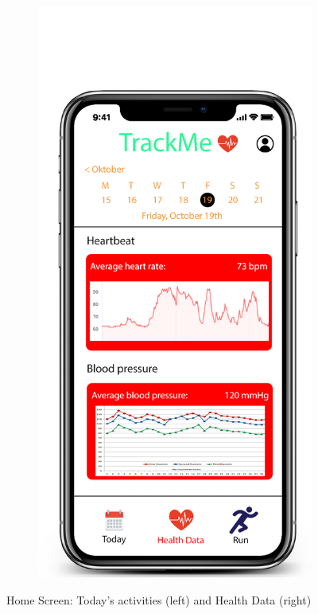 \documentclass[12pt]{article}
\begin{document}
\begin{figure}[t!]
\begin{subfigure}{.4\textwidth}
    \end{subfigure}%
    \begin{subfigure}{.4\textwidth}
        \includegraphics[scale=0.2]{HomeScreen2.png}
        \label{fig:HomeScreen2}
    \end{subfigure}
    \caption{Home Screen: Today's activities (left) and Health Data (right)}
\end{figure}
\end{document}
